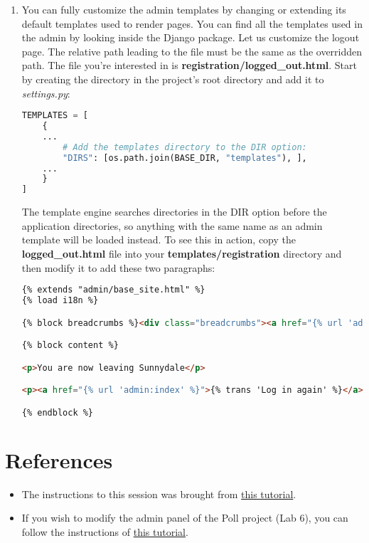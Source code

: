 \documentclass{homework}
\begin{document}
\begin{enumerate}[label=\roman*)]
\begin{lstlisting}[language=python]
@admin.register(Person)
class PersonAdmin(admin.ModelAdmin):
    form = PersonAdminForm
    ...
\end{lstlisting}
    \item You can fully customize the admin templates by changing or extending its default templates used to render pages. You can find all the templates used in the admin by looking inside the Django package. Let us customize the logout page. The relative path leading to the file must be the same as the overridden path. The file you’re interested in is \textbf{registration/logged\_out.html}. Start by creating the directory in the project's root directory and add it to \textit{settings.py}:
    \begin{lstlisting}[language=python]
TEMPLATES = [
    {
    ...
        # Add the templates directory to the DIR option:
        "DIRS": [os.path.join(BASE_DIR, "templates"), ],
    ...
    }
]
\end{lstlisting}
    The template engine searches directories in the DIR option before the application directories, so anything with the same name as an admin template will be loaded instead. To see this in action, copy the \textbf{logged\_out.html} file into your \textbf{templates/registration} directory and then modify it to add these two paragraphs:
    \begin{lstlisting}[language=HTML]
{% extends "admin/base_site.html" %}
{% load i18n %}

{% block breadcrumbs %}<div class="breadcrumbs"><a href="{% url 'admin:index' %}">{% trans 'Home' %}</a></div>{% endblock %}

{% block content %}

<p>You are now leaving Sunnydale</p>

<p><a href="{% url 'admin:index' %}">{% trans 'Log in again' %}</a></p>

{% endblock %}
\end{lstlisting}
    
    

\end{enumerate}
\section*{References}
\begin{itemize}
    \item The instructions to this session was brought from \href{https://realpython.com/customize-django-admin-python/}{this tutorial}.
    \item If you wish to modify the admin panel of the Poll project (Lab 6), you can follow the instructions of \href{https://docs.djangoproject.com/en/4.1/intro/tutorial07/}{this tutorial}.
\end{itemize}
\end{document}
